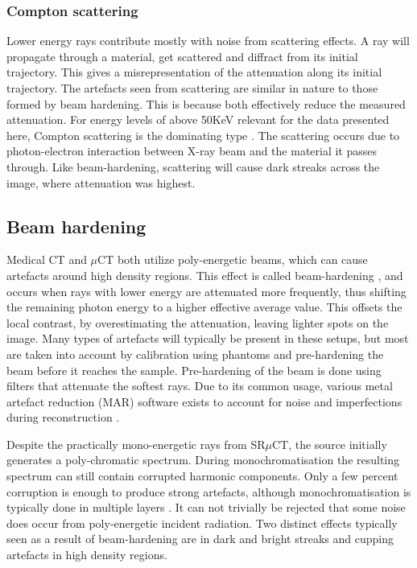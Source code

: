 \subsubsection{Compton scattering}

Lower energy rays contribute mostly with noise from scattering effects. A ray will propagate through
a material, get scattered and diffract from its initial trajectory. This gives a misrepresentation
of the attenuation along its initial trajectory. The artefacts seen from scattering are similar in
nature to those formed by beam hardening. This is because both effectively reduce the measured
attenuation. For energy levels of above 50KeV relevant for the data presented here, Compton
scattering is the dominating type \citep{Compton}. The scattering occurs due to photon-electron
interaction between X-ray beam and the material it passes through. Like beam-hardening, scattering
will cause dark streaks across the image, where attenuation was highest.

\subsection{Beam hardening}\label{sec:beam-hardening}

Medical CT and $\mu$CT both utilize poly-energetic beams, which can cause artefacts around high
density regions. This effect is called beam-hardening \citep{beam-hardening}, and occurs when rays
with lower energy are attenuated more frequently, thus shifting the remaining photon energy to a
higher effective average value. This offsets the local contrast, by overestimating the attenuation,
leaving lighter spots on the image. Many types of artefacts will typically be present in these
setups, but most are taken into account by calibration using phantoms and pre-hardening the beam
before it reaches the sample. Pre-hardening of the beam is done using filters that attenuate the
softest rays. Due to its common usage, various metal artefact reduction (MAR) software exists to
account for noise and imperfections during reconstruction \citep{mar1}\citep{mar2}.

Despite the practically mono-energetic rays from SR$\mu$CT, the source initially generates a
poly-chromatic spectrum. During monochromatisation the resulting spectrum can still contain
corrupted harmonic components. Only a few percent corruption is enough to produce strong
artefacts, although monochromatisation is typically done in multiple layers \citep{srnoise}.
It can not trivially be rejected that some noise does occur from poly-energetic incident radiation.
Two distinct effects typically seen as a result of beam-hardening are in dark and bright streaks
and cupping artefacts in high density regions.

